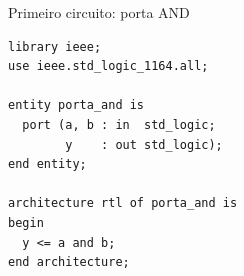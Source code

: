 \begin{frame}[fragile,t]{Primeiro circuito: porta AND}
\begin{lstlisting}
library ieee;
use ieee.std_logic_1164.all;

entity porta_and is
  port (a, b : in  std_logic;
        y    : out std_logic);
end entity;

architecture rtl of porta_and is
begin
  y <= a and b;
end architecture;
\end{lstlisting}
\end{frame}
